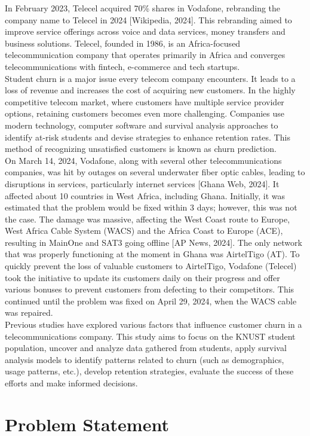 \documentclass[doublespacing,12pt]{report}
\begin{document}
In February 2023, Telecel acquired 70\% shares in Vodafone, rebranding the company name to Telecel in 2024 [Wikipedia, 2024]. This rebranding aimed to improve service offerings across voice and data services, money transfers and business solutions. Telecel, founded in 1986, is an Africa-focused telecommunication company that operates primarily in Africa and converges telecommunications with fintech, e-commerce and tech startups.\\
Student churn is a major issue every telecom company encounters. It leads to a loss of revenue and increases the cost of acquiring new customers. In the highly competitive telecom market, where customers have multiple service provider options, retaining customers becomes even more challenging. Companies use modern technology, computer software and survival analysis approaches to identify at-risk students and devise strategies to enhance retention rates. This method of recognizing unsatisfied customers is known as churn prediction.\\
On March 14, 2024, Vodafone, along with several other telecommunications companies, was hit by outages on several underwater fiber optic cables, leading to disruptions in services, particularly internet services [Ghana Web, 2024]. It affected about 10 countries in West Africa, including Ghana. Initially, it was estimated that the problem would be fixed within 3 days; however, this was not the case. The damage was massive, affecting the West Coast route to Europe, West Africa Cable System (WACS) and the Africa Coast to Europe (ACE), resulting in MainOne and SAT3 going offline [AP News, 2024]. The only network that was properly functioning at the moment in Ghana was AirtelTigo (AT). To quickly prevent the loss of valuable customers to AirtelTigo, Vodafone (Telecel) took the initiative to update its customers daily on their progress and offer various bonuses to prevent customers from defecting to their competitors. This continued until the problem was fixed on April 29, 2024, when the WACS cable was repaired.\\
Previous studies have explored various factors that influence customer churn in a telecommunications company. This study aims to focus on the KNUST student population, uncover and analyze data gathered from students, apply survival analysis models to identify patterns related to churn (such as demographics, usage patterns, etc.), develop retention strategies, evaluate the success of these efforts and make informed decisions.

\section{Problem Statement}
\end{document}
